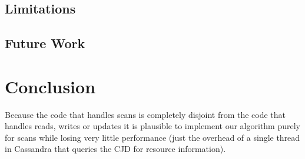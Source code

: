 \subsection{Limitations}

\subsection{Future Work}

\section{Conclusion}
Because the code that handles scans is completely disjoint from the code that handles reads, writes or updates it is plausible to implement our algorithm purely for scans while losing very little performance (just the overhead of a single thread in Cassandra that queries the CJD for resource information).

